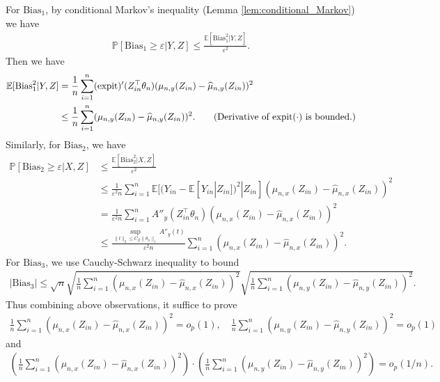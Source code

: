 \documentclass[12pt]{article}
\theoremstyle{definition}
\def\P{\mathbb{P}}
\def\P{\mathbb{P}}
\newcommand{\E}{\mathbb E}								%
\renewcommand{\P}{\mathbb{P}}							%
\newcommand{\expit}{\mathrm{expit}}                 	%
\newcommand{\srx}{X}									%
\newcommand{\srz}{Z}									%
\newcommand{\sry}{Y}									%
\begin{document}
For $\mathrm{Bias}_1$, by conditional Markov's inequality (Lemma \ref{lem:conditional_Markov}) we have
\begin{align*}
  \P[\mathrm{Bias}_1\geq \varepsilon|\sry,\srz]\leq \frac{\E[\mathrm{Bias}_1^2|\sry,\srz]}{\varepsilon^2}.
\end{align*}
Then we have 
\begin{align*}
  \E[\mathrm{Bias}_1^2|\sry,\srz]
  &
  =\frac{1}{n}\sum_{i=1}^n(\expit)'(\srz_{in}^\top\theta_n)(\mu_{n,y}(\srz_{in})-\widehat{\mu}_{n,y}(\srz_{in}))^2\\
  &
  \leq \frac{1}{n}\sum_{i=1}^n(\mu_{n,y}(\srz_{in})-\widehat{\mu}_{n,y}(\srz_{in}))^2.\tag{Derivative of $\expit(\cdot)$ is bounded.}
\end{align*}
Similarly, for $\mathrm{Bias}_2$, we have 
\begin{align*}
  \P[\mathrm{Bias}_2\geq \varepsilon|\srx,\srz]
  &
  \leq \frac{\E[\mathrm{Bias}_2^2|\srx,\srz]}{\varepsilon^2}\\
  &
  \leq \frac{1}{\varepsilon^2n}\sum_{i=1}^n \E[(\sry_{in}-\E[\sry_{in}|\srz_{in}])^2|\srz_{in}](\mu_{n,x}(\srz_{in})-\widehat{\mu}_{n,x}(\srz_{in}))^2\\
  &
  =\frac{1}{\varepsilon^2n}\sum_{i=1}^n A''_y(\srz_{in}^\top\theta_n)(\mu_{n,x}(\srz_{in})-\widehat{\mu}_{n,x}(\srz_{in}))^2\\
  &
  \leq \frac{\sup_{\|t\|_2\leq C_Z\|\theta_n\|_1}A''_y(t)}{\varepsilon^2n}\sum_{i=1}^n(\mu_{n,x}(\srz_{in})-\widehat{\mu}_{n,x}(\srz_{in}))^2\tag{By H\"older's inequality}.
\end{align*}
For $\mathrm{Bias}_3$, we use Cauchy-Schwarz inequality to bound
\begin{align*}
  |\mathrm{Bias}_3|\leq \sqrt{n}\sqrt{\frac{1}{n}\sum_{i=1}^n(\mu_{n,x}(\srz_{in})-\widehat{\mu}_{n,x}(\srz_{in}))^2}\sqrt{\frac{1}{n}\sum_{i=1}^n(\mu_{n,y}(\srz_{in})-\widehat{\mu}_{n,y}(\srz_{in}))^2}.
\end{align*}
Thus combining above observations, it suffice to prove 
\begin{align}\label{eq:estimation_error_hd_glm}
  \frac{1}{n}\sum_{i=1}^n(\mu_{n,x}(\srz_{in})-\widehat{\mu}_{n,x}(\srz_{in}))^2=o_p(1),\quad \frac{1}{n}\sum_{i=1}^n(\mu_{n,y}(\srz_{in})-\widehat{\mu}_{n,y}(\srz_{in}))^2=o_p(1)
\end{align}
and 
\begin{align}\label{eq:product_esitmation_error_hd_glm}
  \left(\frac{1}{n}\sum_{i=1}^n(\mu_{n,x}(\srz_{in})-\widehat{\mu}_{n,x}(\srz_{in}))^2\right)\cdot\left(\frac{1}{n}\sum_{i=1}^n(\mu_{n,y}(\srz_{in})-\widehat{\mu}_{n,y}(\srz_{in}))^2\right)=o_p(1/n).
\end{align}
\end{document}
